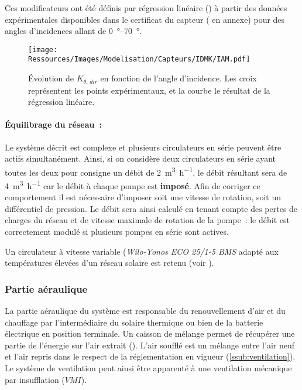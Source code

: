 Ces modificateurs ont été définis par régression linéaire () à partir des données
expérimentales disponibles dans le certificat du capteur ( en annexe)
pour des angles d’incidences allant de \SIrange{0}{70}{\degree}.

\begin{figure}
    \centering
    \texttt{[image: Ressources/Images/Modelisation/Capteurs/IDMK/IAM.pdf]}
    \caption[ pour le rayonnement direct]
             {Évolution de $K_{\theta,\,dir}$ en fonction de l’angle d’incidence.
              Les croix représentent les points expérimentaux, et la courbe le résultat
              de la régression linéaire.}
    \label{fig:IAM_idmk}
\end{figure}

\paragraph{Équilibrage du réseau~:} %
\label{par:equilibrage_du_reseau}
Le système décrit est complexe et plusieurs circulateurs en série peuvent être actifs
simultanément. Ainsi, si on considère deux circulateurs en série ayant toutes les deux pour
consigne un débit de \SI[per- mode=symbol]{2}{\meter\cubed\per\hour}, le débit résultant
sera de \SI[per-mode=symbol]{4}{\meter\cubed\per\hour} car le débit à chaque pompe est
\textbf{imposé}. Afin de corriger ce comportement il est nécessaire d’imposer soit une
vitesse de rotation, soit un différentiel de pression. Le débit sera ainsi calculé
en tenant compte des pertes de charges du réseau et de vitesse maximale de rotation
de la pompe~: le débit est correctement modulé si plusieurs pompes en série sont actives.

Un circulateur à vitesse variable (\textit{Wilo-Yonos ECO 25/1-5 BMS} adapté aux
températures élevées d’un réseau solaire est retenu (voir ).


\subsubsection{Partie aéraulique} %
\label{ssub:partie_aeraulique}
La partie aéraulique du système est responsable du renouvellement d’air et du chauffage
par l’intermédiaire du solaire thermique ou bien de la batterie électrique en
position terminale. Un caisson de mélange permet de récupérer une partie de l’énergie
sur l’air extrait (). L’air soufflé est un mélange entre
l’air neuf et l’air repris dans le respect de la réglementation en vigueur (\ref{ssub:ventilation}).
Le système de ventilation peut ainsi être apparenté à une ventilation mécanique par insufflation
($VMI$).

